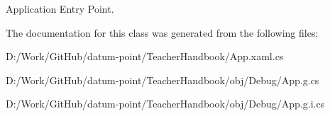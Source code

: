 Application Entry Point. 



The documentation for this class was generated from the following files\+:\begin{DoxyCompactItemize}
\item 
D\+:/\+Work/\+Git\+Hub/datum-\/point/\+Teacher\+Handbook/App.\+xaml.\+cs\item 
D\+:/\+Work/\+Git\+Hub/datum-\/point/\+Teacher\+Handbook/obj/\+Debug/App.\+g.\+cs\item 
D\+:/\+Work/\+Git\+Hub/datum-\/point/\+Teacher\+Handbook/obj/\+Debug/App.\+g.\+i.\+cs\end{DoxyCompactItemize}

